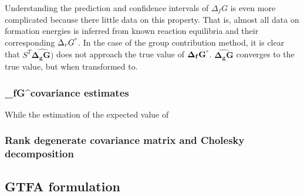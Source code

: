 \documentclass[10pt,letterpaper]{article}
\newcommand{\dgf}{\Delta_fG}
\newcommand{\sdgf}{\Delta_fG^{\degree}}
\newcommand{\sdgr}{\Delta_rG^{\degree}}
\newcommand{\sdgg}{\Delta_gG}
\newcommand{\bsdgg}{\mathbf{\sdgg}}
\newcommand{\bsdgf}{\mathbf{\sdgf}}
\begin{document}

Understanding the prediction and confidence intervals of $\dgf$ is even more complicated because there little data on this property.
That is, almost all data on formation energies is inferred from known reaction equilibria and their corresponding $\sdgr$.
In the case of the group contribution method, it is clear that $S^T\hat{\bsdgg)}$ does not approach the true value of $\bsdgf$.
$\hat{\bsdgg}$ converges to the true value, but when transformed to.








\subsubsection{\sdgf covariance estimates}
While the estimation of the expected value of $$











\subsubsection{Rank degenerate covariance matrix and Cholesky decomposition}

\subsection{GTFA formulation}
\end{document}
